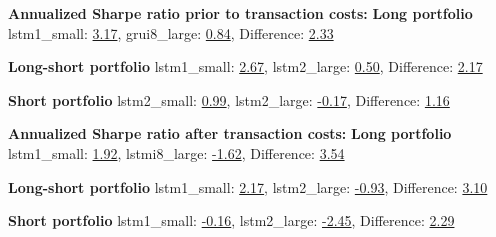 \textbf{Annualized Sharpe ratio prior to transaction costs:}
\indent\newline
\textbf{Long portfolio} 
\indent\newline
lstm1\_small: \underline{3.17},  grui8\_large: \underline{0.84},  Difference: \underline{2.33}

\indent\newline
\textbf{Long-short portfolio} 
\indent\newline
lstm1\_small: \underline{2.67},  lstm2\_large: \underline{0.50},  Difference:  \underline{2.17}  

\indent\newline
\textbf{Short portfolio} 
\indent\newline
lstm2\_small: \underline{0.99},  lstm2\_large: \underline{-0.17},  Difference: \underline{1.16} 

\indent\newline
\indent\newline
\textbf{Annualized Sharpe ratio after transaction costs:}
\indent\newline
\textbf{Long portfolio} 
\indent\newline
lstm1\_small: \underline{1.92},  lstmi8\_large: \underline{-1.62},  Difference: \underline{3.54}

\indent\newline
\textbf{Long-short portfolio}
\indent\newline
lstm1\_small: \underline{2.17},  lstm2\_large: \underline{-0.93},  Difference: \underline{3.10} 
  
\indent\newline
\textbf{Short portfolio} 
\indent\newline
lstm1\_small: \underline{-0.16},  lstm2\_large: \underline{-2.45},  Difference: \underline{2.29}  